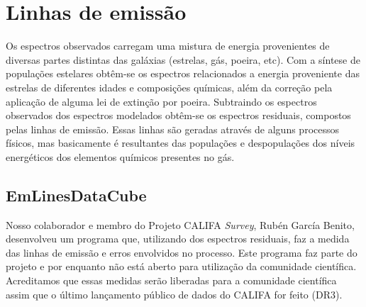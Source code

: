 


\chapter{Linhas de emissão}
\label{sec:emlines}

Os espectros observados carregam uma mistura de energia provenientes de diversas partes distintas
das galáxias (estrelas, gás, poeira, etc). Com a síntese de populações estelares obtêm-se os
espectros relacionados a energia proveniente das estrelas de diferentes idades e composições
químicas, além da correção pela aplicação de alguma lei de extinção por poeira. Subtraindo os
espectros observados dos espectros modelados obtêm-se os espectros residuais, compostos pelas linhas
de emissão. Essas linhas são geradas através de alguns processos físicos, mas basicamente é
resultantes das populações e despopulações dos níveis energéticos dos elementos químicos presentes
no gás.

\section{EmLinesDataCube}
\label{sec:emline:datacube}

Nosso colaborador e membro do Projeto CALIFA {\em Survey}, Rubén García Benito, desenvolveu um
programa que, utilizando dos espectros residuais, faz a medida das linhas de emissão e erros
envolvidos no processo. Este programa faz parte do projeto e por enquanto não está aberto para
utilização da comunidade científica. Acreditamos que essas medidas serão liberadas para a comunidade
científica assim que o último lançamento público de dados do CALIFA for feito (DR3).

